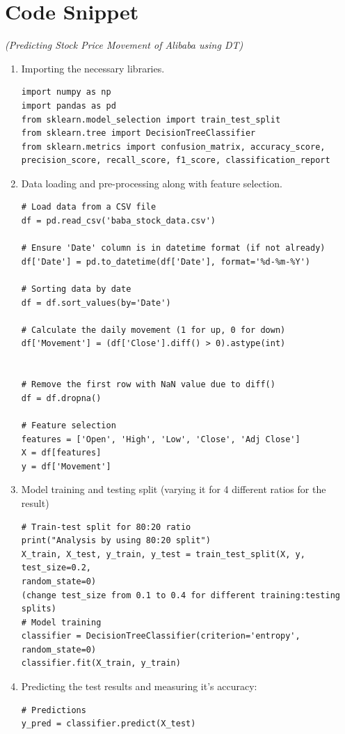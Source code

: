\documentclass[12pt,a4paper]{report}
\begin{document}
\section{Code Snippet} \textit{(Predicting Stock Price Movement of Alibaba using DT)}
\begin{enumerate}
    \item Importing the necessary libraries.
    \begin{verbatim}
import numpy as np
import pandas as pd
from sklearn.model_selection import train_test_split
from sklearn.tree import DecisionTreeClassifier
from sklearn.metrics import confusion_matrix, accuracy_score, 
precision_score, recall_score, f1_score, classification_report
    \end{verbatim}
    \item Data loading and pre-processing along with feature selection.
    \begin{verbatim}
# Load data from a CSV file
df = pd.read_csv('baba_stock_data.csv')

# Ensure 'Date' column is in datetime format (if not already)
df['Date'] = pd.to_datetime(df['Date'], format='%d-%m-%Y')

# Sorting data by date
df = df.sort_values(by='Date')

# Calculate the daily movement (1 for up, 0 for down)
df['Movement'] = (df['Close'].diff() > 0).astype(int)


# Remove the first row with NaN value due to diff()
df = df.dropna()

# Feature selection
features = ['Open', 'High', 'Low', 'Close', 'Adj Close']
X = df[features]
y = df['Movement']

    \end{verbatim}
    \item Model training and testing split (varying it for 4 different ratios for the result)
    \begin{verbatim}
# Train-test split for 80:20 ratio 
print("Analysis by using 80:20 split")
X_train, X_test, y_train, y_test = train_test_split(X, y, test_size=0.2, 
random_state=0)
(change test_size from 0.1 to 0.4 for different training:testing splits)
# Model training
classifier = DecisionTreeClassifier(criterion='entropy', random_state=0)
classifier.fit(X_train, y_train)

    \end{verbatim}
    \item Predicting the test results and measuring it’s accuracy:
    \begin{verbatim}
# Predictions
y_pred = classifier.predict(X_test)


\end{verbatim}
\end{enumerate}
\end{document}
